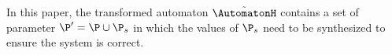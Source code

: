 In this paper, the transformed automaton $\tilde{\AutomatonH}$ contains a set of parameter $\P'= \P \cup \P_s$ in which the values of $\P_s$ need to be synthesized to ensure the system is correct. 







